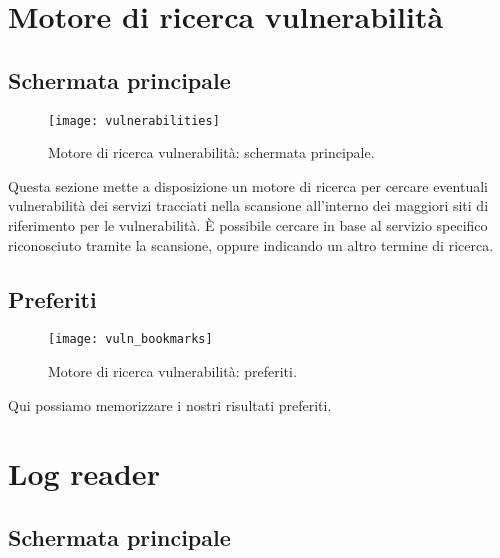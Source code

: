 \chapter{Motore di ricerca vulnerabilit\`a}
\label{ch:Vulnerability}

\section{Schermata principale}
\label{sec:VulnerabilityMain}

\begin{figure}[h]
  \centering
  \texttt{[image: vulnerabilities]}
  \caption{Motore di ricerca vulnerabilit\`a: schermata principale.}
  \label{fig:VulnerabilityMain}
\end{figure}
Questa sezione mette a disposizione un motore di ricerca per cercare eventuali 
vulnerabilit\`a dei servizi tracciati nella scansione all'interno dei maggiori 
siti di riferimento per le vulnerabilit\`a. \`E possibile cercare in base al 
servizio specifico riconosciuto tramite la scansione, oppure indicando un altro 
termine di ricerca.

\section{Preferiti}
\label{sec:VulnerabilityBookmarks}

\begin{figure}[h]
  \centering
  \texttt{[image: vuln\_bookmarks]}
  \caption{Motore di ricerca vulnerabilit\`a: preferiti.}
  \label{fig:VulnerabilityBookmarks}
\end{figure}
Qui possiamo memorizzare i nostri risultati preferiti.

\chapter{Log reader}
\label{ch:LogReader}

\section{Schermata principale}
\label{sec:LogReaderMainScreen}


